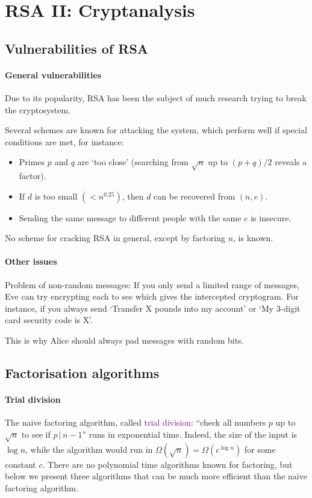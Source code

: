 \documentclass[a4paper, 11pt, openany]{book}
\numberwithin{equation}{section}
\theoremstyle{plain}
\theoremstyle{definition}
\newcommand{\divides}{\,|\,}
\newcommand{\Define}[1]{\textcolor{purple}{#1}}
\begin{document}
\section{RSA II: Cryptanalysis}
\label{sec:15}
\subsection{Vulnerabilities of RSA}

\paragraph{General vulnerabilities}

Due to its popularity, RSA has been the subject of much research trying to break the cryptosystem.

Several schemes are known for attacking the system, which perform well if special conditions are met, for instance:
\begin{itemize}
    \item Primes $p$ and $q$ are ‘too close’ (searching from $\sqrt{n}$ up to $(p+q)/2$ reveals a factor).
    
    \item If $d$ is too small $(< n^{0.25})$, then $d$ can be recovered from $(n,e)$.
    
    \item Sending the same message to different people with the same $e$ is insecure.
\end{itemize}

No scheme for cracking RSA in general, except by factoring $n$, is known.


\paragraph{Other issues}
Problem of non-random messages: If you only send a limited range of messages, Eve can try encrypting each to see which gives the intercepted cryptogram. For instance, if you always send ‘Transfer X pounds into my account’ or ‘My 3-digit card security code is X’.

This is why Alice should always pad messages with random bits.



\subsection{Factorisation algorithms}

\paragraph{Trial division}
The naive factoring algorithm, called \Define{trial division}: ``check all numbers $p$ up to $\sqrt{n}$ to see if $p \divides n-1$'' runs in exponential time. Indeed, the size of the input is $\log n$, while the algorithm would run in $\Omega(\sqrt{n}) = \Omega( c^{\log n} )$ for some constant $c$. There are no polynomial time algorithms known for factoring, but below we present three algorithms that can be much more efficient than the naive factoring algorithm.
\end{document}
